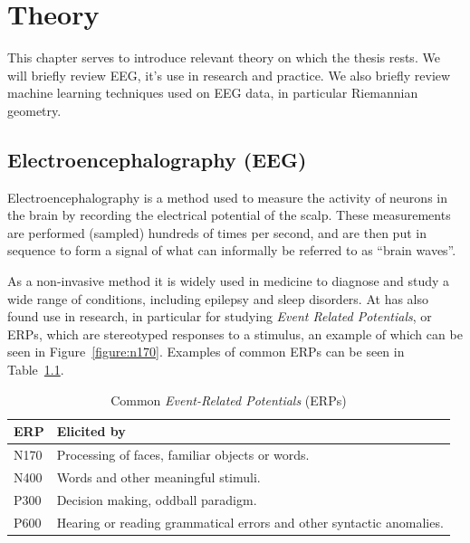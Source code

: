 \chapter{Theory}

This chapter serves to introduce relevant theory on which the thesis rests. We will briefly review EEG, it's use in research and practice. We also briefly review machine learning techniques used on EEG data, in particular Riemannian geometry.

\section{Electroencephalography (EEG)}\label{eeg-theory}

    Electroencephalography is a method used to measure the activity of neurons in the brain by recording the electrical potential of the scalp. These measurements are performed (sampled) hundreds of times per second, and are then put in sequence to form a signal of what can informally be referred to as ``brain waves''. 

    As a non-invasive method it is widely used in medicine to diagnose and study a wide range of conditions, including epilepsy and sleep disorders. 
    At has also found use in research, in particular for studying \emph{Event Related Potentials}, or ERPs, which are stereotyped responses to a stimulus, an example of which can be seen in Figure~\ref{figure:n170}. Examples of common ERPs can be seen in Table~\ref{table:erps}.

    \begin{table}
        \centering
        \begin{tabular}{ll}
            \toprule
            ERP & Elicited by
            \\
            \midrule
            N170 & Processing of faces, familiar objects or words.
            \\
            N400 & Words and other meaningful stimuli.
            \\
            P300 & Decision making, oddball paradigm.
            \\
            P600 & Hearing or reading grammatical errors and other syntactic anomalies.
            \\
            \bottomrule
        \end{tabular}
        \caption{Common \emph{Event-Related Potentials} (ERPs)}\label{table:erps}
    \end{table}

